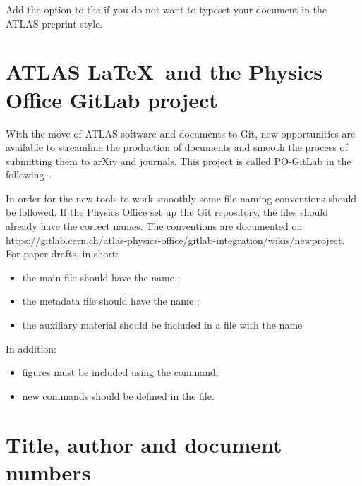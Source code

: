 Add the option  to the 
if you do not want to typeset your document in the ATLAS preprint style.


\section{ATLAS \LaTeX\ and the Physics Office GitLab project}

With the move of ATLAS software and documents to Git,
new opportunities are available to streamline the production of documents
and smooth the process of submitting them to arXiv and journals.
This project is called PO-GitLab in the following~\cite{atlas-PO-gitlab}.

In order for the new tools to work smoothly some file-naming conventions should be followed.
If the Physics Office set up the Git repository, the files should already have the correct names.
The conventions are documented on
\url{https://gitlab.cern.ch/atlas-physics-office/gitlab-integration/wikis/newproject}.
For paper drafts, in short:
\begin{itemize}
  \item the main file should have the name ;
  \item the metadata file should have the name ;
  \item the auxiliary material should be included in a file with the name 
\end{itemize}

In addition:
\begin{itemize}
  \item figures must be included using the  command;
  \item new commands should be defined in the  file.
\end{itemize}


\section{Title, author and document numbers}
\label{sec:metadata}

